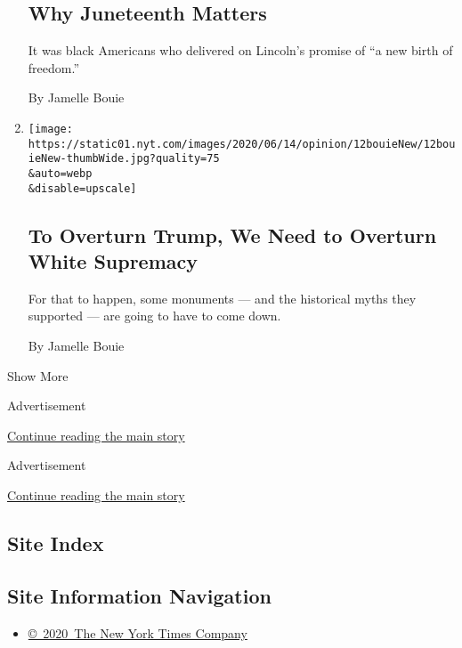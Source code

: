 \begin{enumerate}
  \hypertarget{why-juneteenth-matters}{%
  \subsection{Why Juneteenth Matters}\label{why-juneteenth-matters}}

  It was black Americans who delivered on Lincoln's promise of ``a new
  birth of freedom.''

  By Jamelle Bouie
\item
  \href{/2020/06/12/opinion/sunday/floyd-protests-white-supremacy.html}{}

  \texttt{[image: https://static01.nyt.com/images/2020/06/14/opinion/12bouieNew/12bouieNew-thumbWide.jpg?quality=75\\\&auto=webp\\\&disable=upscale]}

  \hypertarget{to-overturn-trump-we-need-to-overturn-white-supremacy}{%
  \subsection{To Overturn Trump, We Need to Overturn White
  Supremacy}\label{to-overturn-trump-we-need-to-overturn-white-supremacy}}

  For that to happen, some monuments --- and the historical myths they
  supported --- are going to have to come down.

  By Jamelle Bouie
\end{enumerate}

Show More

Advertisement

\protect\hyperlink{after-mid1}{Continue reading the main story}

Advertisement

\protect\hyperlink{after-mktg}{Continue reading the main story}

\hypertarget{site-index}{%
\subsection{Site Index}\label{site-index}}

\hypertarget{site-information-navigation}{%
\subsection{Site Information
Navigation}\label{site-information-navigation}}

\begin{itemize}
\tightlist
\item
  \href{https://help.nytimes.com/hc/en-us/articles/115014792127-Copyright-notice}{©~2020~The
  New York Times Company}
\end{itemize}


